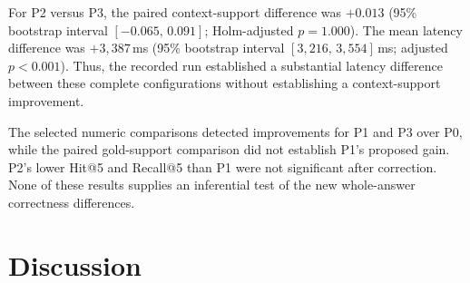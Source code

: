 \begin{table}[H]
\centering
\caption{Selected existing paired comparisons. Mean differences are B minus
A; positive latency differences indicate slower responses. Pairs are
questions with valid scores for both configurations. Reported $p$-values are
Holm-adjusted across the 21 existing comparisons, excluding the newly added
semantic and BERTScore metrics.}
\label{tab:paired-comparisons}
\end{table}

For P2 versus P3, the paired context-support difference was $+0.013$
(95\% bootstrap interval $[-0.065,\,0.091]$; Holm-adjusted $p=1.000$).
The mean latency difference was $+3{,}387$\,ms (95\% bootstrap interval
$[3{,}216,\,3{,}554]$\,ms; adjusted $p<0.001$). Thus, the recorded run
established a substantial latency difference between these complete
configurations without establishing a context-support improvement.

The selected numeric comparisons detected improvements for P1 and P3 over
P0, while the paired gold-support comparison did not establish P1's proposed
gain. P2's lower Hit@5 and Recall@5 than P1 were not significant after
correction. None of these results supplies an inferential test of the new
whole-answer correctness differences.

\section{Discussion}
\fontsize{11}{13}\selectfont

